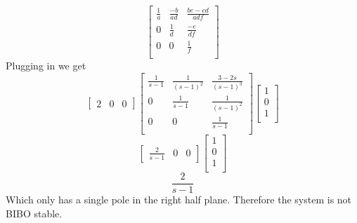 \documentclass{article}
\begin{document}
\begin{enumerate}[a.]
$$\begin{bmatrix}
\frac{1}{a} & \frac{-b}{ad} & \frac{be-cd}{adf} \\
0 & \frac{1}{d} & \frac{-e}{df} \\
0 & 0 & \frac{1}{f} \\
\end{bmatrix}
$$
Plugging in we get
$$
\begin{bmatrix} 2 & 0 & 0 \end{bmatrix}
\begin{bmatrix}
\frac{1}{s-1} & \frac{1}{(s-1)^2} & \frac{3-2 s}{(s-1)^3} \\
0 & \frac{1}{s-1} & \frac{1}{(s-1)^2} \\
0 & 0 & \frac{1}{s-1} \\
\end{bmatrix}
\begin{bmatrix}
1 \\
0 \\
1 \\
\end{bmatrix}
$$
$$
\begin{bmatrix}
\frac{2}{s-1} & 0 & 0
\end{bmatrix}
\begin{bmatrix}
1 \\
0 \\
1 \\
\end{bmatrix}
$$
$$\frac{2}{s-1}$$
Which only has a single pole in the right half plane.
Therefore the system is not BIBO stable.


\end{enumerate}
\end{document}
